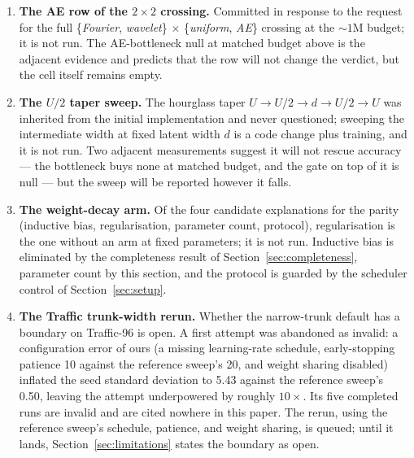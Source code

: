 \begin{enumerate}
\item \textbf{The AE row of the $2\times2$ crossing.} Committed in
response to the request for the full \{\emph{Fourier}, \emph{wavelet}\}
$\times$ \{\emph{uniform}, \emph{AE}\} crossing at the ${\sim}1$M budget;
it is not run. The AE-bottleneck null at matched budget above is the
adjacent evidence and predicts that the row will not change the verdict,
but the cell itself remains empty.
\item \textbf{The $U/2$ taper sweep.} The hourglass taper
$U \rightarrow U/2 \rightarrow d \rightarrow U/2 \rightarrow U$ was
inherited from the initial implementation and never questioned; sweeping
the intermediate width at fixed latent width $d$ is a code change plus
training, and it is not run. Two adjacent measurements suggest it will
not rescue accuracy --- the bottleneck buys none at matched budget, and
the gate on top of it is null --- but the sweep will be reported however
it falls.
\item \textbf{The weight-decay arm.} Of the four candidate explanations
for the parity (inductive bias, regularisation, parameter count,
protocol), regularisation is the one without an arm at fixed parameters;
it is not run. Inductive bias is eliminated by the completeness result of
Section~\ref{sec:completeness}, parameter count by this section, and the
protocol is guarded by the scheduler control of Section~\ref{sec:setup}.
\item \textbf{The Traffic trunk-width rerun.} Whether the narrow-trunk
default has a boundary on Traffic-96 is open. A first attempt was
abandoned as invalid: a configuration error of ours (a missing
learning-rate schedule, early-stopping patience 10 against the reference
sweep's 20, and weight sharing disabled) inflated the seed standard
deviation to 5.43 against the reference sweep's 0.50, leaving the attempt
underpowered by roughly $10\times$. Its five completed runs are invalid
and are cited nowhere in this paper. The rerun, using the reference
sweep's schedule, patience, and weight sharing, is queued; until it
lands, Section~\ref{sec:limitations} states the boundary as open.
\end{enumerate}


